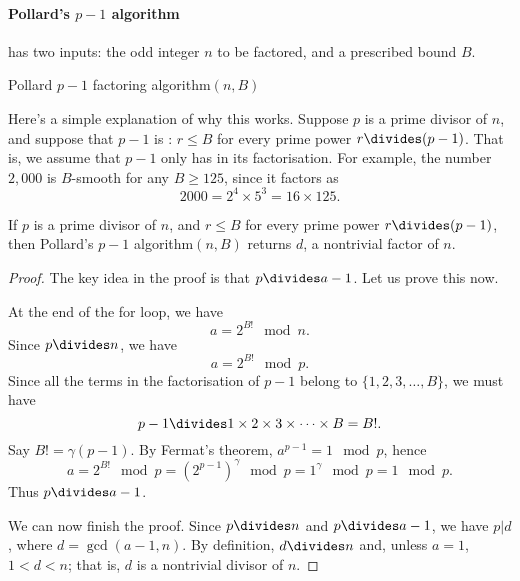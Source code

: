 \documentclass[a4paper, 11pt, openany]{book}
\begin{document}
\paragraph{Pollard's $p-1$ algorithm}

 has two inputs: the odd integer $n$ to be factored, and a prescribed bound $B$.


\begin{algorithm}[H]
\caption{Pollard $p-1$ factoring algorithm$(n,B)$}
\begin{algorithmic}[1]
    \EndFor
    \Else{}
    \EndIf
\end{algorithmic}
\end{algorithm}

Here's a simple explanation of why this works. Suppose $p$ is a prime divisor of $n$, and suppose that $p-1$ is : $r \le B$ for every prime power $r \divides (p-1)$. That is, we assume that $p-1$ only has  in its factorisation. For example, the number $2,000$ is $B$-smooth for any $B \ge 125$, since it factors as
\[
    2000 = 2^4 \times 5^3 = 16 \times 125.
\]

\begin{theorem}\label{th:pollard_p-1}
If $p$ is a prime divisor of $n$, and $r \le B$ for every prime power $r \divides (p-1)$, then Pollard's $p-1$ algorithm$(n,B)$ returns $d$, a nontrivial factor of $n$.
\end{theorem}


\begin{proof}
The key idea in the proof is that $p \divides a-1$. Let us prove this now.

At the end of the for loop, we have
\[
    a = 2^{B!} \mod n.
\]
Since $p \divides n$, we have
\[
    a = 2^{B!} \mod p.
\]
Since all the terms in the factorisation of $p-1$ belong to $\{1, 2, 3, \dots, B\}$, we must have
\[
    p-1 \divides 1 \times 2 \times 3 \times \dots \times B = B!.
\]
Say $B! = \gamma (p-1)$. By Fermat's theorem, $a^{p-1} = 1 \mod p$, hence
\[
    a = 2^{B!} \mod p = \left( 2^{p-1} \right)^\gamma \mod p = 1^\gamma \mod p = 1 \mod p.
\]
Thus $p \divides a-1$.

We can now finish the proof. Since $p \divides n$ and $p \divides a-1$, we have $p | d$, where $d = \gcd(a-1,n)$. By definition, $d \divides n$ and, unless $a = 1$, $1 < d < n$; that is, $d$ is a nontrivial divisor of $n$.
\end{proof}
\end{document}
